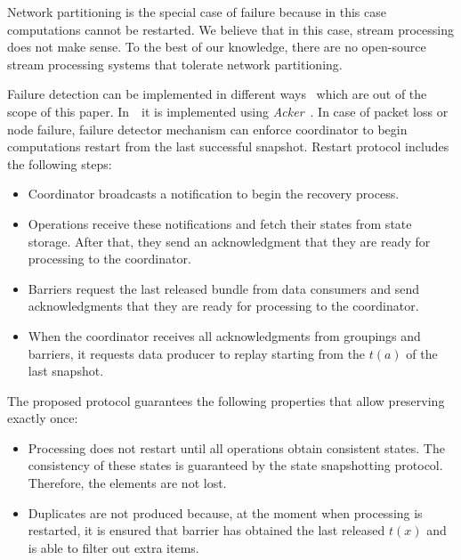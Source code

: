 Network partitioning is the special case of failure because in this case computations cannot be restarted. We believe that in this case, stream processing does not make sense. To the best of our knowledge, there are no open-source stream processing systems that tolerate network partitioning.

Failure detection can be implemented in different ways~\cite{hayashibara2002failure} which are out of the scope of this paper. In~\FlameStream\ it is implemented using {\em Acker}~\cite{we2018adbis}. In case of packet loss or node failure, failure detector mechanism can enforce coordinator to begin computations restart from the last successful snapshot. Restart protocol includes the following steps:

\begin{itemize}
    \item Coordinator broadcasts a notification to begin the recovery process.
    \item Operations receive these notifications and fetch their states from state storage. After that, they send an acknowledgment that they are ready for processing to the coordinator.
    \item Barriers request the last released bundle from data consumers and send acknowledgments that they are ready for processing to the coordinator.
    \item When the coordinator receives all acknowledgments from groupings and barriers, it requests data producer to replay starting from the $t(a)$ of the last snapshot.
\end{itemize}

The proposed protocol guarantees the following properties that allow preserving exactly once:

\begin{itemize}
    \item Processing does not restart until all operations obtain consistent states. The consistency of these states is guaranteed by the state snapshotting protocol. Therefore, the elements are not lost.
    \item Duplicates are not produced because, at the moment when processing is restarted, it is ensured that barrier has obtained the last released $t(x)$ and is able to filter out extra items.
\end{itemize}